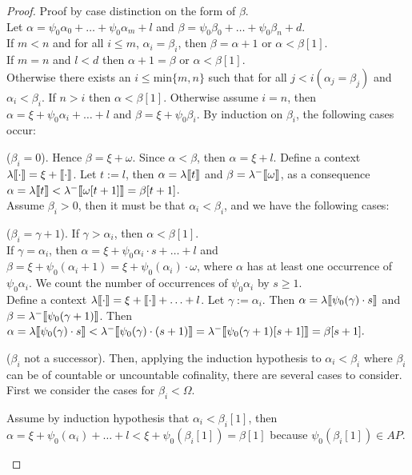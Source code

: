 \documentclass{amsart}
\theoremstyle{plain}
\theoremstyle{plain}
\def\scbrl{[\hspace{-.14em}[}
\def\scbrr{]\hspace{-.14em}]}
\def\scbr#1{\scbrl#1\scbrr}
\newcommand{\Om}{{\Omega}}
\newcommand{\al}{{\alpha}}
\newcommand{\be}{{\beta}}
\newcommand{\ga}{\gamma}
\newcommand{\la}{\lambda}
\newcommand{\om}{\omega}
\def\scbrl{[\hspace{-.14em}[}
\def\scbrr{]\hspace{-.14em}]}
\def\scbr#1{\scbrl#1\scbrr}
\begin{document}
\begin{proof}
Proof by case distinction on the form of $\be$.\\
Let $\al=\psi_0{\al_0} + \ldots + \psi_0{\al_m} +l$ and $\be = \psi_0{\be_0} + \ldots + \psi_0{\be_n} + d$.\medskip
\\
If $m<n$ and for all $i\leq m$, $\al_i=\be_i$, then $\be=\al+1$ or $\al<\be[1]$.\medskip
\\
If $m=n$ and $l<d$ then $\al+1=\be$ or $\al<\be[1]$. \medskip
\\
Otherwise there exists an $i\leq \text{min}\{m,n\}$ such that for all $j<i (\al_j=\be_j)$ and $\al_i<\be_i$.  If $n>i$ then $\al<\be[1]$.
Otherwise assume $i=n$, then $\al = \xi+\psi_0\al_i + \ldots + l$ and $\be =\xi+\psi_0\be_i$.
By induction on $\be_i$, the following cases occur:
\begin{Cases}
    \item ($\be_i = 0$).
    Hence $\be = \xi + \om$. Since $\al<\be$, then $\al = \xi + l$.
    Define a context  $\la\scbr{\cdot} = \xi+ \scbr{\cdot}$.
    Let $t := l$, then $\al = \la\scbr{t}$ and $\be = \la^-\scbr{\om}$, as a consequence $\al =  \la\scbr{t}< \la^-\scbr{\om[t+1]} = \be[t+1]$.\medskip
    \\
    Assume $\be_i > 0$, then it must be that $\al_i<\be_i$, and we have the following cases:
    \item ($\be_i=\ga+1$).
    If $\ga>\al_i$, then $\al<\be[1]$.\\
    If $\ga=\al_i$, then $\al =\xi+\psi_0\al_i \cdot s+ \ldots + l$ and $\be = \xi+\psi_0(\al_i+1) = \xi+\psi_0(\al_i) \cdot \om $, where $\al$ has at least one occurrence of $\psi_0\al_i$. We count the number of occurrences of $\psi_0\al_i$ by $s\geq 1$.\\
    Define a context $\la\scbr{\cdot} =  \xi +  \scbr{\cdot} + \ldots+ l$.
    Let $\ga:= \al_i$. Then $\al = \la\scbr{\psi_0(\ga)\cdot s }$ and $\be= \la^-\scbr{\psi_0(\ga+1)}$.
    Then $\al = \la\scbr{\psi_0(\ga)\cdot s}< \la^-\scbr{\psi_0(\ga)\cdot (s+1)}  = \la^-\scbr{\psi_0(\ga+1)[s+1]} = \be[s+1].$
    
    \item ($\be_i$ not a successor). Then, applying the induction hypothesis to $\al_i<\be_i$ where $\be_i$ can be of countable or uncountable cofinality, there are several cases to consider.
    First we consider the cases for $\be_i < \Om$. %
    \begin{Cases}
        \item Assume by induction hypothesis that $\al_i<\be_i[1]$, then $\al=\xi + \psi_0(\al_i) +\ldots+l < \xi +\psi_0(\be_i[1]) = \be[1]$ because $\psi_0(\be_i[1]) \in AP$. \medskip
        

\end{Cases}
\end{Cases}
\end{proof}
\end{document}
